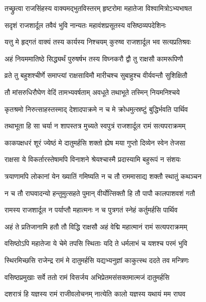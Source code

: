 
\twolineshloka
{तच्छ्रुत्वा राजसिंहस्य वाक्यमद्भुतविस्तरम्}
{हृष्टरोमा महातेजा विश्वामित्रोऽभ्यभाषत} %

\twolineshloka
{सदृशं राजशार्दूल तवैवं भुवि नान्यतः}
{महावंशप्रसूतस्य वसिष्ठव्यपदेशिनः} %

\twolineshloka
{यत्तु मे हृद्गतं वाक्यं तस्य कार्यस्य निश्चयम्}
{कुरुष्व राजशार्दूल भव सत्यप्रतिश्रवः} %

\twolineshloka
{अहं नियममातिष्ठे सिद्ध्यर्थं पुरुषर्षभ}
{तस्य विघ्नकरौ द्वौ तु राक्षसौ कामरूपिणौ} %

\twolineshloka
{व्रते तु बहुशश्चीर्णे समाप्त्यां राक्षसाविमौ}
{मारीचश्च सुबाहुश्च वीर्यवन्तौ सुशिक्षितौ} %

\twolineshloka
{तौ मांसरुधिरौघेण वेदिं तामभ्यवर्षताम्}
{अवधूते तथाभूते तस्मिन् नियमनिश्चये} %

\twolineshloka
{कृतश्रमो निरुत्साहस्तस्माद् देशादपाक्रमे}
{न च मे क्रोधमुत्स्रष्टुं बुद्धिर्भवति पार्थिव} %

\twolineshloka
{तथाभूता हि सा चर्या न शापस्तत्र मुच्यते}
{स्वपुत्रं राजशार्दूल रामं सत्यपराक्रमम्} %

\twolineshloka
{काकपक्षधरं शूरं ज्येष्ठं मे दातुमर्हसि}
{शक्तो ह्येष मया गुप्तो दिव्येन स्वेन तेजसा} %

\twolineshloka
{राक्षसा ये विकर्तारस्तेषामपि विनाशने}
{श्रेयश्चास्मै प्रदास्यामि बहुरूपं न संशयः} %

\twolineshloka
{त्रयाणामपि लोकानां येन ख्यातिं गमिष्यति}
{न च तौ राममासाद्य शक्तौ स्थातुं कथञ्चन} %

\twolineshloka
{न च तौ राघवादन्यो हन्तुमुत्सहते पुमान्}
{वीर्योत्सिक्तौ हि तौ पापौ कालपाशवशं गतौ} %

\twolineshloka
{रामस्य राजशार्दूल न पर्याप्तौ महात्मनः}
{न च पुत्रगतं स्नेहं कर्तुमर्हसि पार्थिव} %

\twolineshloka
{अहं ते प्रतिजानामि हतौ तौ विद्धि राक्षसौ}
{अहं वेद्मि महात्मानं रामं सत्यपराक्रमम्} %

\twolineshloka
{वसिष्ठोऽपि महातेजा ये चेमे तपसि स्थिताः}
{यदि ते धर्मलाभं च यशश्च परमं भुवि} %

\twolineshloka
{स्थिरमिच्छसि राजेन्द्र रामं मे दातुमर्हसि}
{यद्यभ्यनुज्ञां काकुत्स्थ ददते तव मन्त्रिणः} %

\twolineshloka
{वसिष्ठप्रमुखाः सर्वे ततो रामं विसर्जय}
{अभिप्रेतमसंसक्तमात्मजं दातुमर्हसि} %

\twolineshloka
{दशरात्रं हि यज्ञस्य रामं राजीवलोचनम्}
{नात्येति कालो यज्ञस्य यथायं मम राघव} %

